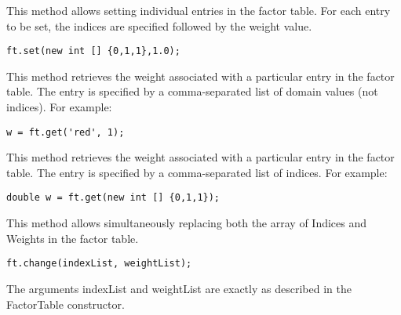 \ifjava

This method allows setting individual entries in the factor table.  For each entry to be set, the indices are specified followed by the weight value.  

\begin{lstlisting}
ft.set(new int [] {0,1,1},1.0);
\end{lstlisting}
\fi


\ifmatlab
This method retrieves the weight associated with a particular entry in the factor table.  The entry is specified by a comma-separated list of domain values (not indices).  For example:

\begin{lstlisting}
w = ft.get('red', 1);
\end{lstlisting}
\fi

\ifjava
This method retrieves the weight associated with a particular entry in the factor table.  The entry is specified by a comma-separated list of indices.  For example:

\begin{lstlisting}
double w = ft.get(new int [] {0,1,1});
\end{lstlisting}
\fi


This method allows simultaneously replacing both the array of Indices and Weights in the factor table.

\begin{lstlisting}
ft.change(indexList, weightList);
\end{lstlisting}

The arguments indexList and weightList are exactly as described in the FactorTable constructor.

